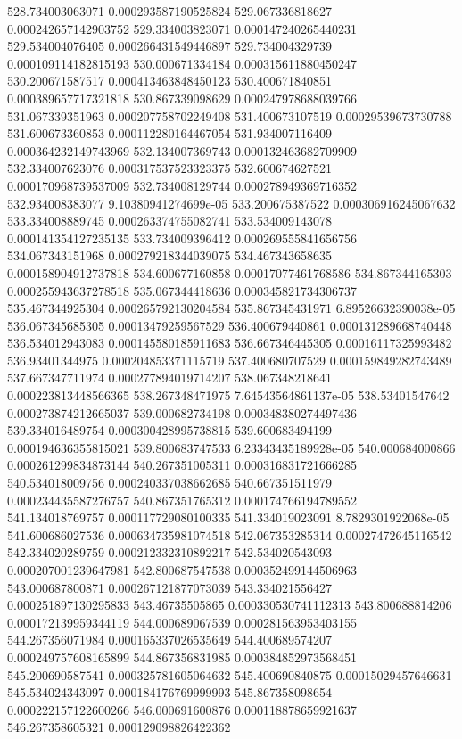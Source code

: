 {528.734003063071 0.000293587190525824
529.067336818627 0.000242657142903752
529.334003823071 0.000147240265440231
529.534004076405 0.000266431549446897
529.734004329739 0.000109114182815193
530.000671334184 0.000315611880450247
530.200671587517 0.000413463848450123
530.400671840851 0.000389657717321818
530.867339098629 0.000247978688039766
531.067339351963 0.000207758702249408
531.400673107519 0.00029539673730788
531.600673360853 0.000112280164467054
531.934007116409 0.000364232149743969
532.134007369743 0.000132463682709909
532.334007623076 0.000317537523323375
532.600674627521 0.000170968739537009
532.734008129744 0.000278949369716352
532.934008383077 9.10380941274699e-05
533.200675387522 0.000306916245067632
533.334008889745 0.000263374755082741
533.534009143078 0.000141354127235135
533.734009396412 0.000269555841656756
534.067343151968 0.000279218344039075
534.467343658635 0.000158904912737818
534.600677160858 0.00017077461768586
534.867344165303 0.000255943637278518
535.067344418636 0.000345821734306737
535.467344925304 0.000265792130204584
535.867345431971 6.89526632390038e-05
536.067345685305 0.00013479259567529
536.400679440861 0.000131289668740448
536.534012943083 0.000145580185911683
536.667346445305 0.00016117325993482
536.93401344975 0.000204853371115719
537.400680707529 0.000159849282743489
537.667347711974 0.000277894019714207
538.067348218641 0.000223813448566365
538.267348471975 7.64543564861137e-05
538.53401547642 0.000273874212665037
539.000682734198 0.000348380274497436
539.334016489754 0.000300428995738815
539.600683494199 0.000194636355815021
539.800683747533 6.23343435189928e-05
540.000684000866 0.000261299834873144
540.267351005311 0.000316831721666285
540.534018009756 0.000240337038662685
540.667351511979 0.000234435587276757
540.867351765312 0.000174766194789552
541.134018769757 0.000117729080100335
541.334019023091 8.7829301922068e-05
541.600686027536 0.000634735981074518
542.067353285314 0.00027472645116542
542.334020289759 0.000212332310892217
542.534020543093 0.000207001239647981
542.800687547538 0.000352499144506963
543.000687800871 0.000267121877073039
543.334021556427 0.000251897130295833
543.46735505865 0.000330530741112313
543.800688814206 0.000172139959344119
544.000689067539 0.000281563953403155
544.267356071984 0.000165337026535649
544.400689574207 0.000249757608165899
544.867356831985 0.000384852973568451
545.200690587541 0.000325781605064632
545.400690840875 0.00015029457646631
545.534024343097 0.000184176769999993
545.867358098654 0.000222157122600266
546.000691600876 0.000118878659921637
546.267358605321 0.000129098826422362
}
